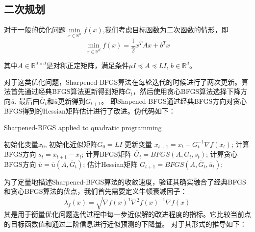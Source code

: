 \documentclass[a4paper,twoside,AutoFakeBold]{article}
\theoremstyle{definition}
\begin{document}
\subsection{二次规划}

对于一般的优化问题$\mathop{\min}\limits_{x\in\mathbb{R}^n}f(x)$,我们考虑目标函数为二次函数的情形，即
\begin{equation}
    \mathop{\min}\limits_{x\in\mathbb{R}^d}f(x)=\frac{1}{2}x^TAx+b^Tx
\end{equation}

其中$A\in\mathbb{R}^{d\times d}$是对称正定矩阵，满足条件$\mu I\preceq A\preceq LI$, $b\in\mathbb{R}^d$。

对于这类优化问题，Sharpened-BFGS算法在每轮迭代的时候进行了两次更新。算法首先通过经典BFGS算法更新得到矩阵$\overline{G}_t$，然后使用贪心BFGS算法选择下降方向$\overline{u}$, 最后由$\overline{G}_t$和$\overline{u}$更新得到$G_{t+1}$。
即Shapened-BFGS通过经典BFGS方向对贪心BFGS得到的Hessian矩阵估计进行了改进。伪代码如下：

\begin{algorithm}[H]\xiaosi
    \caption{\xiaosi Sharpened-BFGS applied to quadratic programming}
    \begin{algorithmic}\label{algorithm:1}
        \REQUIRE 初始化变量$x_0$, 初始化近似矩阵$G_0=LI$
            \STATE 更新变量 $x_{t+1}=x_t-G_t^{-1}\nabla f(x_t)$;
            \STATE 计算BFGS方向 $s_t=x_{t+1}-x_t$;
            \STATE 计算BFGS矩阵 $\overline{G}_t=BFGS(A,G_t,s_t)$;
            \STATE 计算贪心BFGS方向 $\overline{u}=\overline{u} (A,\overline{G}_t)$;
            \STATE 估计Hessian矩阵 $G_{t+1}=BFGS(A,\overline{G}_t,\overline{u}_t)$;
        \ENDFOR
    \end{algorithmic}
\end{algorithm}

为了定量地描述Sharpened-BFGS算法的收敛速度，验证其确实融合了经典BFGS和贪心BFGS算法的优点，我们首先需要定义牛顿衰减因子：
\begin{equation}
    \lambda_f (x)=\sqrt{\nabla f(x)^T\nabla ^2 f(x)^{-1}\nabla f(x)}
\end{equation}
其是用于衡量优化问题迭代过程中每一步近似解的改进程度的指标。它比较当前点的目标函数值和通过二阶信息进行近似预测的下降量。
对于其形式的推导如下：
\end{document}
